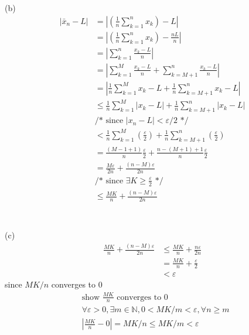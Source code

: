 \documentclass[12pt, border = 4pt, multi]{article} %
\begin{document}
\\
\\
(b)
\begin{align*}
|\bar{x}_n - L| &= \left|\left(\frac{1}{n}\sum_{k = 1} ^ n x_k\right) - L\right|\\
&= \left|\left(\frac{1}{n}\sum_{k = 1} ^ n x_k\right) - \frac{nL}{n}\right|\\
&= \left|\sum_{k = 1} ^ n\frac{x_k - L}{n}\right|\\
&= \left|\sum_{k = 1} ^ M\frac{x_k - L}{n} + \sum_{k = M + 1} ^ n\frac{x_k - L}{n}\right|\\
&= \left|\frac{1}{n}\sum_{k = 1} ^ M x_k - L + \frac{1}{n}\sum_{k = M + 1} ^ n x_k - L\right|\\
&\leq \frac{1}{n}\sum_{k = 1} ^ M |x_k - L| + \frac{1}{n}\sum_{k = M + 1} ^ n |x_k - L|\\
&\text{/* since } |x_n - L| < \varepsilon / 2 \text{ */}\\
&< \frac{1}{n}\sum_{k = 1} ^ M \left(\frac{\varepsilon}{2}\right) + \frac{1}{n}\sum_{k = M + 1} ^ n \left(\frac{\varepsilon}{2}\right)\\
&= \frac{(M - 1 + 1)}{n}\frac{\varepsilon}{2} + \frac{n - (M + 1) + 1}{n}\frac{\varepsilon}{2}\\
&= \frac{M\varepsilon}{2n} + \frac{(n - M)\varepsilon}{2n}\\
&\text{/* since } \exists K \geq \frac{\varepsilon}{2} \text{ */}\\
&\leq \frac{MK}{n} + \frac{(n - M)\varepsilon}{2n}\\
\end{align*}
\\
\\
(c)
\begin{align*}
\frac{MK}{n} + \frac{(n - M)\varepsilon}{2n} &\leq \frac{MK}{n} + \frac{n\varepsilon}{2n}\\
&= \frac{MK}{n} + \frac{\varepsilon}{2}\\
&< \varepsilon
\end{align*}
since $MK / n$ converges to 0
\begin{align*}
&\text{show } \frac{MK}{n} \text{ converges to 0}\\
&\forall \varepsilon > 0, \exists m \in \mathbb{N}, 0 < MK / m < \varepsilon, \forall n \geq m\\
&\left|\frac{MK}{n} - 0\right| = MK / n \leq MK / m < \varepsilon
\end{align*}
\end{document}
